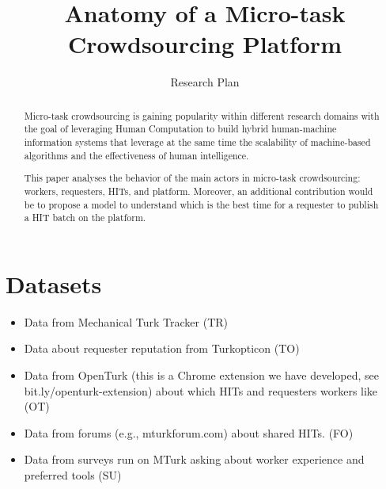\documentclass{sig-alternate}
\begin{document}
%

\title{Anatomy of a Micro-task Crowdsourcing Platform}
\subtitle{Research Plan}



\author{}

\maketitle
\begin{abstract}
Micro-task crowdsourcing is gaining popularity within different research domains with the goal of leveraging Human Computation to build
hybrid human-machine information systems that leverage at the same time the scalability of machine-based algorithms and the effectiveness of human intelligence.

This paper analyses the behavior of the main actors in micro-task crowdsourcing: workers, requesters, HITs, and platform. Moreover, an additional contribution would be to propose a model to understand which is the best time for a requester to publish a HIT batch on the platform.
\end{abstract}

%
%


\section{Datasets}
\begin{itemize}
	\item Data from Mechanical Turk Tracker (TR)
	\item Data about requester reputation from Turkopticon (TO)
	\item Data from OpenTurk (this is a Chrome extension we have developed, see bit.ly/openturk-extension) about which HITs and requesters workers like (OT)
	\item Data from forums (e.g., mturkforum.com) about shared HITs. (FO)
	\item Data from surveys run on MTurk asking about worker experience and preferred tools (SU)
\end{itemize}
\end{document}

